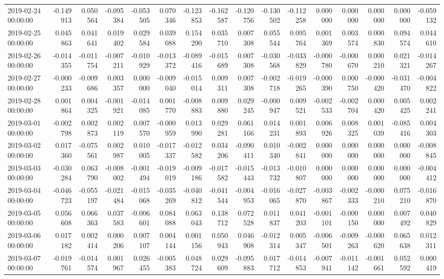 \begin{tabular}{lrrrrrrrrrrrrrrr}
2019-02-24 00:00:00 & -0.149913 & 0.050564 & -0.095384 & -0.053505 & 0.070346 & -0.123853 & -0.162587 & -0.120756 & -0.130502 & -0.112258 & 0.000000 & 0.000000 & 0.000000 & 0.000000 & -0.059132 \\
2019-02-25 00:00:00 & 0.045863 & 0.041641 & 0.019402 & 0.029584 & 0.039088 & 0.154290 & 0.035710 & 0.007308 & 0.055544 & 0.095764 & 0.001369 & 0.003574 & 0.000830 & 0.094574 & 0.044610 \\
2019-02-26 00:00:00 & -0.014355 & -0.011754 & -0.007211 & -0.010929 & -0.013372 & -0.089416 & -0.015689 & 0.007308 & -0.030568 & -0.033829 & -0.000780 & -0.000670 & 0.000210 & 0.021321 & -0.014267 \\
2019-02-27 00:00:00 & -0.000233 & -0.009686 & 0.003357 & 0.000000 & -0.009040 & -0.015014 & 0.009311 & 0.007308 & -0.002718 & -0.019265 & -0.000390 & 0.000750 & -0.000420 & -0.031470 & -0.004822 \\
2019-02-28 00:00:00 & 0.001864 & 0.004325 & -0.001921 & -0.014085 & 0.001770 & -0.008883 & 0.009880 & 0.029245 & -0.000947 & 0.009521 & -0.002533 & -0.002704 & 0.000420 & 0.005425 & 0.002241 \\
2019-03-01 00:00:00 & -0.002798 & 0.002873 & 0.002119 & 0.007570 & -0.000959 & 0.013990 & 0.029281 & 0.061166 & 0.014231 & 0.001893 & 0.006926 & 0.008325 & 0.001039 & -0.085416 & 0.004303 \\
2019-03-02 00:00:00 & 0.017360 & -0.075561 & 0.002987 & 0.010005 & -0.017337 & -0.012582 & 0.034206 & -0.090411 & 0.010340 & -0.002841 & 0.000000 & 0.000000 & 0.000000 & 0.000000 & -0.008845 \\
2019-03-03 00:00:00 & -0.030284 & 0.063790 & -0.008002 & -0.001494 & -0.019019 & -0.009186 & -0.017582 & -0.015443 & -0.013732 & -0.010807 & 0.000000 & 0.000000 & 0.000000 & 0.000000 & -0.004412 \\
2019-03-04 00:00:00 & -0.046723 & -0.055197 & -0.021484 & -0.015068 & -0.035269 & -0.040812 & -0.041544 & -0.004953 & -0.016065 & -0.027870 & -0.003867 & -0.002333 & -0.000210 & 0.075210 & -0.016870 \\
2019-03-05 00:00:00 & 0.056608 & 0.066363 & 0.037583 & -0.006601 & 0.084088 & 0.063043 & 0.138712 & 0.072528 & 0.011837 & 0.041203 & -0.001101 & -0.000150 & 0.000000 & 0.007492 & 0.040829 \\
2019-03-06 00:00:00 & 0.017182 & 0.002414 & 0.000206 & 0.007107 & 0.004144 & 0.001156 & 0.050943 & 0.046908 & -0.012314 & 0.005347 & -0.006501 & -0.009263 & -0.000620 & 0.065638 & 0.012311 \\
2019-03-07 00:00:00 & -0.019761 & -0.014574 & 0.001967 & 0.026455 & -0.005383 & 0.048724 & 0.029609 & -0.095883 & 0.017712 & -0.014853 & -0.007941 & -0.011142 & -0.001661 & 0.052592 & 0.000419 \\

\end{tabular}
